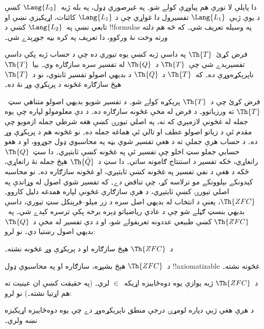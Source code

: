 \documentclass[../../../include/open-logic-section]{subfiles}
\begin{document}


دا پايلې لا نورې هم پياوړې کولے شو۔ په غيرصوري ډول، په بله
ژبه~$\Lang{L_2}$ کښې د يوې ژبې~$\Lang{L_1}$ تفسيرول دا غواړي چې د
$\Lang{L_1}$ کائنات، اړيکيزې نښې او تابعي نښې په~$\Lang{L_2}$ کښې
د !!{formula}s په وسيله تعريف شي۔ که څه هم دلته ورته وخت نۀ ورکوو،
دا تعريف په کره بڼه جوړېدے شي۔

\begin{thm}
  فرض کړئ~$\Th{T}$ په داسې ژبه کښې يوه تيوري ده چې د حساب ژبه پکې
  داسې تفسيرېدے شي چې~$\Th{T}$ د~$\Th{Q}$ له تفسير سره سازګاره وي۔
  بيا~$\Th{T}$ ناپرېکړه‌وړې ده۔ که~$\Th{T}$ د~$\Th{Q}$ د بديهي
  اصولو تفسير ثابتوي، نو د~$\Th{T}$ هېڅ سازګاره غځونه د پرېکړې وړ
  نۀ ده۔
\end{thm}

فرض کړئ چې د~$\Th{T}$ پرېکړه کولے شو۔ د تفسير شويو بديهي اصولو متناهي سټ~$\Th{T}$ ته ورزياتوو۔ د فرض له مخې غځونه سازګاره ده۔ د دې معلومولو لپاره چې يوه جمله له غځونې لازمېږي که نه، په اصلي تيورۍ کښې هغه شرطي جمله ازمويو چې مقدم ئې د زياتو اصولو عطف او تالي ئې هماغه جمله ده۔ نو غځونه هم د پرېکړې وړ ده۔ د حساب هرې جملې ته د هغې تفسير شوې بڼه په محاسبوي ډول جوړوو، او د هغو حسابي جملو سټ اخلو چې تفسير ئې په غځونه کښې ثابتېږي۔ دا سټ~$\Th{Q}$ رانغاړي، ځکه تفسير د استنتاج ګامونه ساتي۔ دا سټ د~$\Th{\bar Q}$ هېڅ جمله نۀ رانغاړي، ځکه د هغې د نفي تفسير په غځونه کښې ثابتېږي، او غځونه سازګاره ده۔ نو محاسبه کېدونکے بېلوونکے مو ترلاسه کړ، چې تناقض دے۔ که تفسير شوي اصول له وړاندې په اصلي تيورۍ کښې ثابتېږي، د هرې سازګارې غځونې لپاره همدغه دليل کاروو۔
$\Th{ZFC}$، يعنې د انتخاب له بديهي اصل سره د زر مېلو--فرېنکل سټ
تيوري، داسې بديهي بنسټ ګڼلے شو چې د عادي رياضياتو ډېره برخه پکې
ترسره کېدے شي۔ په~$\Th{ZFC}$ کښې طبيعي عددونه تعريفولے شو، او د
دې تفسير له مخې د~$\Th{Q}$ بديهي اصول رښتيا دي۔ نو لرو:

\begin{cor}
د~$\Th{ZFC}$ هېڅ سازګاره او د پرېکړې وړ غځونه نشته۔
\end{cor}

\begin{cor}
د~$\Th{ZFC}$ هېڅ بشپړه، سازګاره او په محاسبوي ډول
!!{axiomatizable} غځونه نشته۔
\end{cor}

د~$\Th{ZFC}$ ژبه يوازې يوه دوه‌ځاييزه اړيکه~$\in$ لري۔ (په حقيقت
کښې ان عينيت ته هم اړتيا نشته۔) نو لرو:

\begin{cor}
د هرې هغې ژبې دپاره لومړۍ درجې منطق ناپرېکړه‌وړ دے چې يوه
دوه‌ځاييزه اړيکيزه نښه ولري۔
\end{cor}
\end{document}
